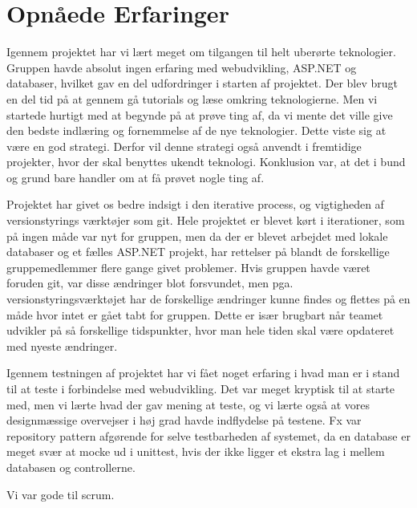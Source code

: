 \chapter{Opnåede Erfaringer}

Igennem projektet har vi lært meget om tilgangen til helt uberørte teknologier. Gruppen havde absolut ingen erfaring med webudvikling, ASP.NET og databaser, hvilket gav en del udfordringer i starten af projektet. Der blev brugt en del tid på at gennem gå tutorials og læse omkring teknologierne. Men vi startede hurtigt med at begynde på at prøve ting af, da vi mente det ville give den bedste indlæring og fornemmelse af de nye teknologier. Dette viste sig at være en god strategi. Derfor vil denne strategi også anvendt i fremtidige projekter, hvor der skal benyttes ukendt teknologi. Konklusion var, at det i bund og grund bare handler om at få prøvet nogle ting af.  

Projektet har givet os bedre indsigt i den iterative process, og vigtigheden af versionstyrings værktøjer som git. Hele projektet er blevet kørt i iterationer, som på ingen måde var nyt for gruppen, men da der er blevet arbejdet med lokale databaser og et fælles ASP.NET projekt, har rettelser på blandt de forskellige gruppemedlemmer flere gange givet problemer. Hvis gruppen havde været foruden git, var disse ændringer blot forsvundet, men pga. versionstyringsværktøjet har de forskellige ændringer kunne findes og flettes på en måde hvor intet er gået tabt for gruppen. Dette er især brugbart når teamet udvikler på så forskellige tidspunkter, hvor man hele tiden skal være opdateret med nyeste ændringer.

Igennem testningen af projektet har vi fået noget erfaring i hvad man er i stand til at teste i forbindelse med webudvikling. Det var meget kryptisk til at starte med, men vi lærte hvad der gav mening at teste, og vi lærte også at vores designmæssige overvejser i høj grad havde indflydelse på testene. Fx var repository pattern afgørende for selve testbarheden af systemet, da en database er meget svær at mocke ud i unittest, hvis der ikke ligger et ekstra lag i mellem databasen og controllerne.

Vi var gode til scrum. 
